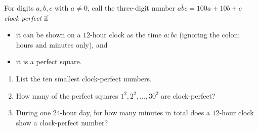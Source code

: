 For digits $a,b,c$ with $a\ne0$, call the three-digit number $\overline{abc}=100a+10b+c$ \emph{clock-perfect} if
\begin{itemize}
\item it can be shown on a $12$-hour clock as the time $a{:}bc$ (ignoring the colon; hours and minutes only), and
\item it is a perfect square.
\end{itemize}
\begin{enumerate}
\item[(a)] List the ten smallest clock-perfect numbers.
\item[(b)] How many of the perfect squares $1^2,2^2,\dots,30^2$ are clock-perfect?
\item[(c)] During one $24$-hour day, for how many minutes in total does a $12$-hour clock show a clock-perfect number?
\end{enumerate}
